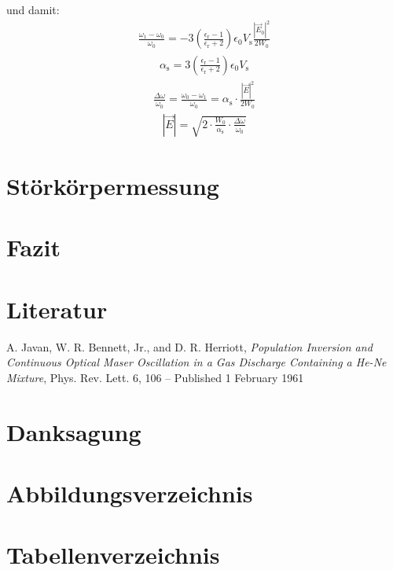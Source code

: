 \documentclass[11pt, a4paper]{scrbook}
\newcommand{\ve}{\vec{E}}
\begin{document}
	und damit:
	\begin{align}
		\frac{\omega_1 - \omega_0}{\omega_0} = - 3 \left( \frac{\epsilon_\mathrm{r} - 1}{\epsilon_\mathrm{r} + 2} \right) \epsilon_0 V_\mathrm{s} \frac{|\ve_0|^2}{2 W_0}
	\end{align}
	\begin{align}
		\alpha_\mathrm{s} = 3 \left( \frac{\epsilon_\mathrm{r} - 1}{\epsilon_\mathrm{r} + 2} \right) \epsilon_0 V_\mathrm{s}
	\end{align}
	\begin{align}
		\frac{\Delta \omega}{\omega_0} = \frac{\omega_0 - \omega_1}{\omega_0} = \alpha_\mathrm{s} \cdot \frac{|\ve|^2}{2 W_0}
	\end{align}
	\begin{align}
		|\ve| = \sqrt{2 \cdot \frac{W_0}{\alpha_\mathrm{s}} \cdot \frac{\Delta \omega}{\omega_0}}
	\end{align}
	
	\chapter{Störkörpermessung}
	
	\chapter{Fazit}
	
	\backmatter
	
	\chapter{Literatur}
	
	\begin{thebibliography}{19}
		A. Javan, W. R. Bennett, Jr., and D. R. Herriott,
		\emph{Population Inversion and Continuous Optical Maser Oscillation in a Gas Discharge Containing a He-Ne Mixture},
		Phys. Rev. Lett. 6, 106 – Published 1 February 1961
	
	\end{thebibliography}
	
	\chapter{Danksagung}
	
	\chapter{Abbildungsverzeichnis}
	\listoffigures
	
	\chapter{Tabellenverzeichnis}
	\listoftables
	
\end{document}
